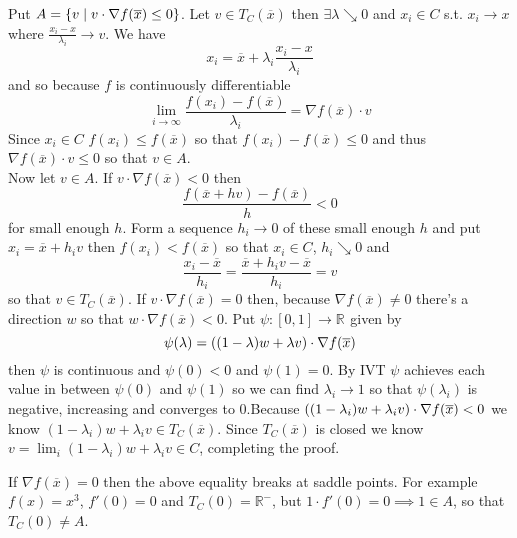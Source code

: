 \documentclass{article}
\newenvironment{ex}[1]
  {\renewcommand\theexercise{#1}\exercise}
  {\endexercise}
\newcommand{\R}[1]{\mathbb{R}^{#1}}
\newcommand{\xb}{\overline{x}}
\begin{document}
\begin{ex}{10.16} %
  Put $A = \braces{ v \mid v \cdot \nabla f(\xb) \le 0 }$. Let $v \in T_C(\xb)$ then $\exists \lambda \searrow 0$ and $x_i \in C$ s.t. $x_i \to x$ where $\frac{x_i - x}{\lambda_i} \to v$. We have
  $$
  x_i = \xb + \lambda_i \frac{x_i - x}{\lambda_i}
  $$
  and so because $f$ is continuously differentiable
  $$
  \lim_{i \to \infty} \frac{f(x_i) - f(\xb)}{\lambda_i} = \nabla f(\xb) \cdot v
  $$
  Since $x_i \in C$ $f(x_i) \le f(\xb)$ so that $f(x_i) - f(\xb) \le 0$ and thus $\nabla f(\xb) \cdot v \le 0$ so that $v \in A$. \, \\

  Now let $v \in A$. If $v \cdot \nabla f(\xb) < 0$ then
  $$
  \frac{f(\xb + h v) - f(\xb)}{h} < 0
  $$
  for small enough $h$. Form a sequence $h_i \to 0$ of these small enough $h$ and put $x_i = \xb + h_i v$ then $f(x_i) < f(\xb)$ so that $x_i \in C$, $h_i \searrow 0$ and
  $$
  \frac{x_i - \xb}{h_i} = \frac{\xb + h_i v - \xb}{h_i} = v
  $$
  so that $v \in T_C(\xb)$. If $v \cdot \nabla f(\xb) = 0$ then, because $\nabla f(\xb) \ne 0$ there's a direction $w$ so that $w \cdot \nabla f(\xb) < 0$. Put $\psi : [0, 1] \to \R{}$ given by
  $$
  \psi(\lambda) = \parens{ (1-\lambda)w + \lambda v } \cdot \nabla f(\xb)
  $$
  then $\psi$ is continuous and $\psi(0) < 0$ and $\psi(1) = 0$. By IVT $\psi$ achieves each value in between $\psi(0)$ and $\psi(1)$ so we can find $\lambda_i \to 1$ so that $\psi(\lambda_i)$ is negative, increasing and converges to $0$.Because $\parens{ (1-\lambda_i)w + \lambda_i v } \cdot \nabla f(\xb) < 0$ we know $(1-\lambda_i)w + \lambda_i v \in T_C(\xb)$. Since $T_C(\xb)$ is closed we know $v = \lim_i (1-\lambda_i)w + \lambda_i v \in C$, completing the proof. \, \\
  \pagehline

  If $\nabla f(\xb) = 0$ then the above equality breaks at saddle points. For example $f(x) = x^3$, $f'(0) = 0$ and $T_C(0) = \R{-}$, but $1 \cdot f'(0) = 0 \implies 1 \in A$, so that $T_C(0) \ne A$.
\end{ex} %
\end{document}
